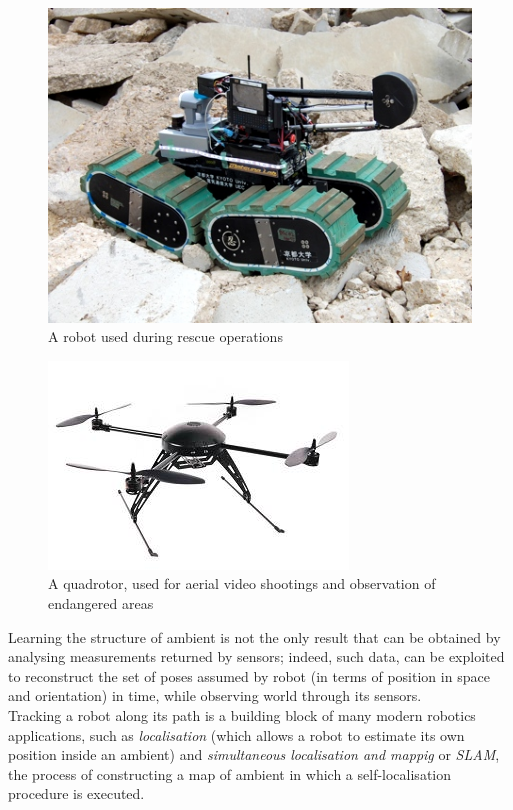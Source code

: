 \documentclass[a4paper, onecolumn]{report}
\begin{document}
\begin{figure}[htb]
\centering
\centering\setlength{\captionmargin}{0pt}%
\includegraphics[width=.90\textwidth]{images/rescue.jpg}
\caption{A robot used during rescue operations}
\end{figure}

\begin{figure}[htb]
\centering
\centering\setlength{\captionmargin}{0pt}%
\includegraphics[width=.90\textwidth]{images/quadrotor.jpg}
\caption{A quadrotor, used for aerial video shootings and observation of endangered areas}
\end{figure}

Learning the structure of ambient is not the only result that can be obtained by analysing measurements returned by sensors; indeed, such data, can be exploited to reconstruct the set of poses assumed by robot (in terms of position in space and orientation) in time, while observing world through its sensors. \\
Tracking a robot along its path is a building block of many modern robotics applications, such as \emph{localisation} (which allows a robot to estimate its own position inside an ambient) and \emph{simultaneous localisation and mappig} or \emph{SLAM}, the process of constructing a map of ambient in which a self-localisation procedure is executed.
\end{document}
